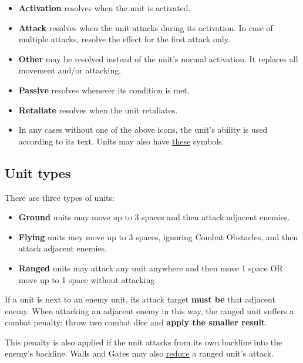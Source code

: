 \begin{itemize}[wide]
  \item\textbf{Activation}  resolves when the unit is activated.
  \item\textbf{Attack}  resolves when the unit attacks during its activation.
    In case of multiple attacks, resolve the effect for the first attack only.
  \item\textbf{Other}  may be resolved instead of the unit's normal activation.
    It replaces all movement and/or attacking.
  \item\textbf{Passive}  resolves whenever its condition is met.
  \item\textbf{Retaliate}  resolves when the unit retaliates.
  \item In any cases without one of the above icons, the unit’s ability is used according to its text.
    Units may also have \hyperlink{Playerdecks}{these} symbols.
\end{itemize}

\clearpage
\subsection*{\hypertarget{Unittype}{Unit types}}
There are three types of units:
\begin{itemize}
  \item \textbf{Ground}  units may move up to 3 spaces and then attack adjacent enemies.
  \item \textbf{Flying}  units mey move up to 3 spaces, ignoring Combat Obstacles, and then attack adjacent enemies.
  \item \textbf{Ranged}  units may attack any unit anywhere and then move 1 space OR move up to 1 space without attacking.
\end{itemize}
If a  unit is next to an enemy unit, its attack target \textbf{must be} that adjacent enemy.
When attacking an adjacent enemy in this way, the ranged unit suffers a combat penalty: throw two combat dice and \textbf{apply the smaller result}.\par
This penalty is also applied if the  unit attacks from its own backline into the enemy's backline.
Walls and Gates may also \hyperlink{Walls}{reduce} a ranged unit's attack.

